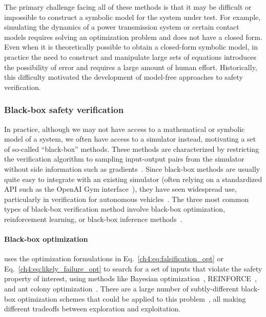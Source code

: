 The primary challenge facing all of these methods is that it may be difficult or impossible to construct a symbolic model for the system under test. For example, simulating the dynamics of a power transmission system or certain contact models requires solving an optimization problem and does not have a closed form. Even when it is theoretically possible to obtain a closed-form symbolic model, in practice the need to construct and manipulate large sets of equations introduces the possibility of error and requires a large amount of human effort. Historically, this difficulty motivated the development of model-free approaches to safety verification.

\subsubsection{Black-box safety verification}


In practice, although we may not have access to a mathematical or symbolic model of a system, we often have access to a simulator instead, motivating a set of so-called ``black-box'' methods. These methods are characterized by restricting the verification algorithm to sampling input-output pairs from the simulator without side information such as gradients~\cite{corsoSurveyAlgorithmsBlackBox2021}. Since black-box methods are usually quite easy to integrate with an existing simulator (often relying on a standardized API such as the OpenAI Gym interface~\cite{brockmanOpenAIGym2016}), they have seen widespread use, particularly in verification for autonomous vehicles~\cite{xuSafeBenchBenchmarkingPlatform2022,riedmaierSurveyScenarioBasedSafety2020,okellyScalableEndtoEndAutonomous2018,corsoAdaptiveStressTesting2019,wangAdvSimGeneratingSafetyCritical2021,sunCornerCaseGeneration2021,zhongGuidedConditionalDiffusion2022,corsoInterpretableSafetyValidation2020a,zhangAdversarialRobustnessTrajectory2022,hanselmannKINGGeneratingSafetyCritical2022a}. The three most common types of black-box verification method involve black-box optimization, reinforcement learning, or black-box inference methods~\cite{corsoSurveyAlgorithmsBlackBox2021}.

\paragraph{Black-box optimization} uses the optimization formulations in Eq.~\eqref{ch4:eq:falsification_opt} or Eq.~\eqref{ch4:eq:likely_failure_opt} to search for a set of inputs that violate the safety property of interest, using methods like Bayesian optimization~\cite{wangAdvSimGeneratingSafetyCritical2021}, REINFORCE~\cite{dingLearningCollideAdaptive2020a}, and ant colony optimization~\cite{annpureddySTaLiRoToolTemporal2011}. There are a large number of subtly-different black-box optimization schemes that could be applied to this problem~\cite{kochenderfer_wheeler_2019}, all making different tradeoffs between exploration and exploitation.

